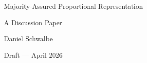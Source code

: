 \documentclass[a4paper, 12pt, numbers=noenddot, parskip=half]{scrartcl}
\begin{document}
\begin{titlepage}
  \centering
  \vspace*{6cm}
  {\LARGE Majority-Assured Proportional Representation\par}
  \vspace{2cm}
  {\normalsize A Discussion Paper\par}
  \vspace{1cm}
  {\normalsize Daniel Schwalbe\par}
  \vspace{1cm}
  {\normalsize Draft --- April 2026\par}
  \vfill
\end{titlepage}

\tableofcontents
\newpage


\newpage










\end{document}
